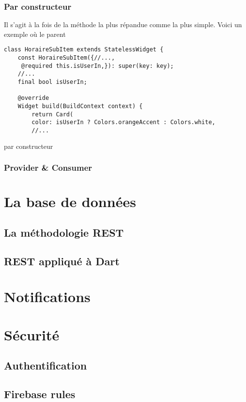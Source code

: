         \subsubsection{Par constructeur}
        Il s'agit à la fois de la méthode la plus répandue comme la plus simple. Voici un exemple où le parent 
            \begin{listing}[h]
                \begin{verbatim}
class HoraireSubItem extends StatelessWidget {
    const HoraireSubItem({//...,
     @required this.isUserIn,}): super(key: key);
    //...
    final bool isUserIn;

    @override
    Widget build(BuildContext context) {
        return Card(
        color: isUserIn ? Colors.orangeAccent : Colors.white,
        //...
                \end{verbatim}
            \caption{par constructeur}
            \label{code:horaireSubItem}
            \end{listing}
        \subsubsection{Provider \& Consumer}


    \section{La base de données}
        \subsection{La méthodologie REST}
        \subsection{REST appliqué à Dart}

            
    \section{Notifications}


    
    \section{Sécurité}

        \subsection{Authentification}

        \subsection{Firebase rules}
